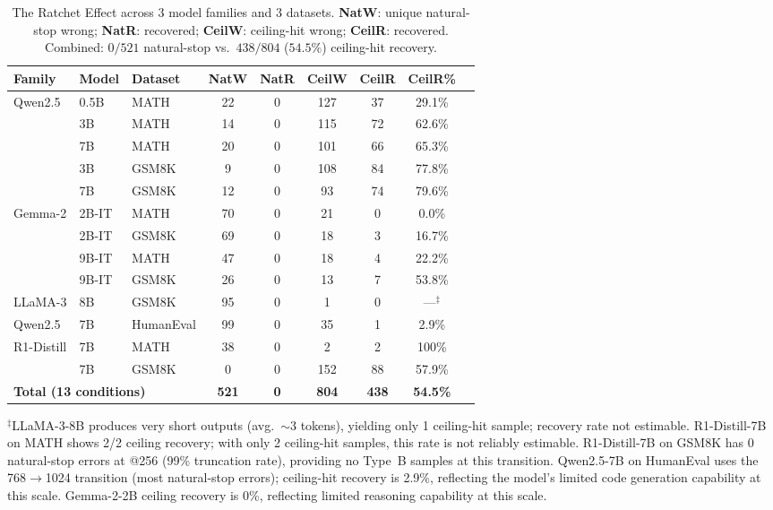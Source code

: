 \documentclass{article}
\begin{document}
\begin{table}[t]
\centering
\caption{The Ratchet Effect across 3 model families and 3 datasets. \textbf{NatW}: unique natural-stop wrong; \textbf{NatR}: recovered; \textbf{CeilW}: ceiling-hit wrong; \textbf{CeilR}: recovered. Combined: $0/521$ natural-stop vs.\ $438/804$ ($54.5\%$) ceiling-hit recovery.}
\label{tab:ratchet}
\begin{tabular}{lllcccccc}
\toprule
\textbf{Family} & \textbf{Model} & \textbf{Dataset} & \textbf{NatW} & \textbf{NatR} & \textbf{CeilW} & \textbf{CeilR} & \textbf{CeilR\%} \\
\midrule
\multirow{5}{*}{Qwen2.5} & 0.5B & MATH & 22 & 0 & 127 & 37 & 29.1\% \\
 & 3B & MATH & 14 & 0 & 115 & 72 & 62.6\% \\
 & 7B & MATH & 20 & 0 & 101 & 66 & 65.3\% \\
 & 3B & GSM8K & 9 & 0 & 108 & 84 & 77.8\% \\
 & 7B & GSM8K & 12 & 0 & 93 & 74 & 79.6\% \\
\midrule
\multirow{4}{*}{Gemma-2} & 2B-IT & MATH & 70 & 0 & 21 & 0 & 0.0\% \\
 & 2B-IT & GSM8K & 69 & 0 & 18 & 3 & 16.7\% \\
 & 9B-IT & MATH & 47 & 0 & 18 & 4 & 22.2\% \\
 & 9B-IT & GSM8K & 26 & 0 & 13 & 7 & 53.8\% \\
\midrule
LLaMA-3 & 8B & GSM8K & 95 & 0 & 1 & 0 & ---$^{\ddagger}$ \\
\midrule
\multirow{1}{*}{Qwen2.5} & 7B & HumanEval & 99 & 0 & 35 & 1 & 2.9\% \\
\midrule
R1-Distill & 7B & MATH & 38 & 0 & 2 & 2 & 100\% \\
 & 7B & GSM8K & 0 & 0 & 152 & 88 & 57.9\% \\
\midrule
\multicolumn{3}{l}{\textbf{Total (13 conditions)}} & \textbf{521} & \textbf{0} & \textbf{804} & \textbf{438} & \textbf{54.5\%} \\
\bottomrule
\end{tabular}
\vspace{1mm}

\raggedright\small $^{\ddagger}$LLaMA-3-8B produces very short outputs (avg.\ $\sim$3 tokens), yielding only 1 ceiling-hit sample; recovery rate not estimable. R1-Distill-7B on MATH shows 2/2 ceiling recovery; with only 2 ceiling-hit samples, this rate is not reliably estimable. R1-Distill-7B on GSM8K has 0 natural-stop errors at @256 (99\% truncation rate), providing no Type~B samples at this transition. Qwen2.5-7B on HumanEval uses the 768$\to$1024 transition (most natural-stop errors); ceiling-hit recovery is 2.9\%, reflecting the model's limited code generation capability at this scale. Gemma-2-2B ceiling recovery is 0\%, reflecting limited reasoning capability at this scale.
\end{table}
\end{document}
